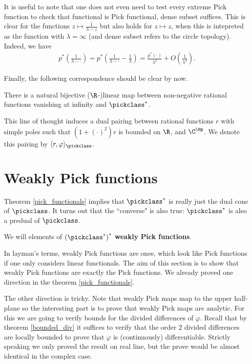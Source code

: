 It is useful to note that one does not even need to test every extreme Pick function to check that functional is Pick functional, dense subset suffices. This is clear for the functions $z \mapsto \frac{1}{\lambda - z}$ but also holds for $z \mapsto z$, when this is intepreted as the function with $\lambda = \infty$ (and dense subset refers to the circle topology). Indeed, we have
\begin{align*}
	p^{*}\left(\frac{1}{\lambda - \cdot}\right) = p^{*}\left(\frac{1}{\lambda - \cdot} - \frac{1}{\lambda}\right) = \frac{p^{*}(\cdot)}{\lambda^2} + O\left(\frac{1}{\lambda^3}\right).
\end{align*}

Finally, the following correspondence should be clear by now.

\begin{prop}
	There is a natural bijective ($\R$-)linear map between non-negative rational functions vanishing at infinity and $\pickclass^{*}$.
\end{prop}

This line of thought induces a dual pairing between rational functions $r$ with simple poles such that $(1 + (\cdot)^2) r$ is bounded on $\R$, and $\C^{\Hp}$. We denote this pairing by $\langle r, \varphi \rangle_{\pickclass}$.

\section{Weakly Pick functions}

Theorem \ref{pick_functionals} implies that $\pickclass^{*}$ is really just the dual cone of $\pickclass$. It turns out that the ``converse" is also true: $\pickclass^{*}$ is also a predual of $\pickclass$.

\begin{maar}
	We will elements of $\left(\pickclass^{*}\right)^{*}$ \textbf{weakly Pick functions}.
\end{maar}

In layman's terms, weakly Pick functions are ones, which look like Pick functions if one only considers linear functionals. The aim of this section is to show that weakly Pick functions are exactly the Pick functions. We already proved one direction in the theorem \ref{pick_functionals}. 

The other direction is tricky. Note that weakly Pick maps map to the upper half-plane so the interesting part is to prove that weakly Pick maps are analytic. For this we are going to verify bounds for the divided differences of $\varphi$. Recall that by theorem \ref{bounded_div} it suffices to verify that the order $2$ divided differences are locally bounded to prove that $\varphi$ is (continuously) differentiable. Strictly speaking we only proved the result on real line, but the prove would be almost identical in the complex case.

